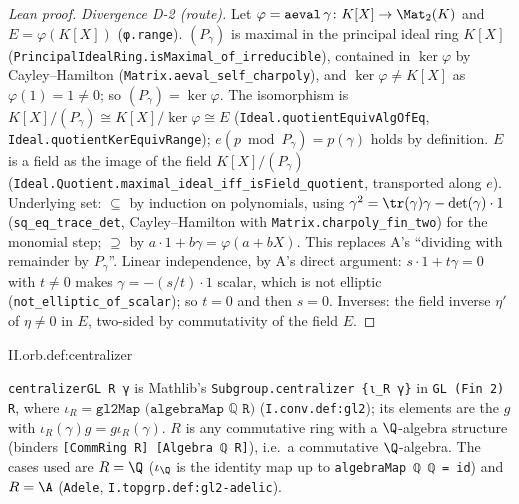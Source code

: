 \begin{proof}[Lean proof]
\emph{Divergence D-2 (route).} Let $\varphi=\texttt{aeval}\,\gamma\colon K[X]\to\Mat_2(K)$ and $E=\varphi(K[X])$ (\texttt{φ.range}). $(P_\gamma)$ is maximal in the principal ideal ring $K[X]$ (\texttt{PrincipalIdealRing.isMaximal\_of\_irreducible}), contained in $\ker\varphi$ by Cayley--Hamilton (\texttt{Matrix.aeval\_self\_charpoly}), and $\ker\varphi\ne K[X]$ as $\varphi(1)=1\ne0$; so $(P_\gamma)=\ker\varphi$. The isomorphism is $K[X]/(P_\gamma)\cong K[X]/\ker\varphi\cong E$ (\texttt{Ideal.quotientEquivAlgOfEq}, \texttt{Ideal.quotientKerEquivRange}); $e(p\bmod P_\gamma)=p(\gamma)$ holds by definition. $E$ is a field as the image of the field $K[X]/(P_\gamma)$ (\texttt{Ideal.Quotient.maximal\_ideal\_iff\_isField\_quotient}, transported along $e$). Underlying set: $\subseteq$ by induction on polynomials, using $\gamma^2=\tr(\gamma)\gamma-\det(\gamma)\cdot1$ (\texttt{sq\_eq\_trace\_det}, Cayley--Hamilton with \texttt{Matrix.charpoly\_fin\_two}) for the monomial step; $\supseteq$ by $a\cdot1+b\gamma=\varphi(a+bX)$. This replaces A's ``dividing with remainder by $P_\gamma$''. Linear independence, by A's direct argument: $s\cdot1+t\gamma=0$ with $t\ne0$ makes $\gamma=-(s/t)\cdot1$ scalar, which is not elliptic (\texttt{not\_elliptic\_of\_scalar}); so $t=0$ and then $s=0$. Inverses: the field inverse $\eta'$ of $\eta\ne0$ in $E$, two-sided by commutativity of the field $E$.
\end{proof}

\begin{definition}[centralizers]
\end{definition}
\begin{tfformal}{II.orb.def:centralizer}
\begin{tffidelity}
\texttt{centralizerGL R γ} is Mathlib's \texttt{Subgroup.centralizer \{ι\_R γ\}} in \texttt{GL (Fin 2) R}, where $\iota_R=\texttt{gl2Map (algebraMap ℚ R)}$ (\texttt{I.conv.def:gl2}); its elements are the $g$ with $\iota_R(\gamma)g=g\iota_R(\gamma)$. $R$ is any commutative ring with a $\Q$-algebra structure (binders \texttt{[CommRing R] [Algebra ℚ R]}), i.e.\ a commutative $\Q$-algebra. The cases used are $R=\Q$ ($\iota_\Q$ is the identity map up to \texttt{algebraMap ℚ ℚ = id}) and $R=\A$ (\texttt{Adele}, \texttt{I.topgrp.def:gl2-adelic}).
\end{tffidelity}
\end{tfformal}


